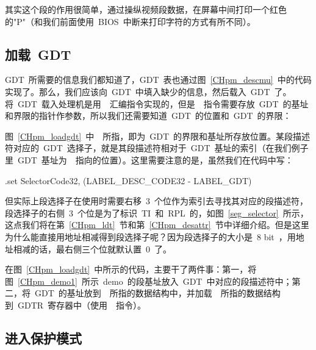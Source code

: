 \label{CHpm_demo1}

其实这个段的作用很简单，通过操纵视频段数据，在屏幕中间打印一个红色的"P"（和我们前面使用~BIOS~中断来打印字符的方式有所不同）。

\subsection{加载~GDT} \label{CHpm_secloadgdt}

GDT~所需要的信息我们都知道了，GDT~表也通过图~\ref{CHpm_descmu}~中的代码实现了。那么，我们应该向~GDT~中填入缺少的信息，然后载入~GDT~了。将~GDT~载入处理机是用~~汇编指令实现的，但是~~指令需要存放~GDT~的基址和界限的指针作参数，所以我们还需要知道~GDT~的位置和~GDT~的界限：

\label{CHpm_loadgdt}

图~\ref{CHpm_loadgdt}~中~~所指，即为~GDT~的界限和基址所存放位置。某段描述符对应的~GDT~选择子，就是其段描述符相对于~GDT~基址的索引（在我们例子里~GDT~基址为~~指向的位置）。这里需要注意的是，虽然我们在代码中写：

\begin{Command}
.set SelectorCode32, (LABEL_DESC_CODE32 - LABEL_GDT)
\end{Command}
但实际上段选择子在使用时需要右移~3~个位作为索引去寻找其对应的段描述符，段选择子的右侧~3~个位是为了标识~TI~和~RPL~的，如图~\ref{seg_selector}~所示，这点我们将在第~\ref{CHpm_ldt}~节和第~\ref{CHpm_desattr}~节中详细介绍。但是这里为什么能直接用地址相减得到段选择子呢？因为段选择子的大小是~8 bit~，用地址相减的话，最右侧三个位就默认置~0~了。

在图~\ref{CHpm_loadgdt}~中所示的代码，主要干了两件事：第一，将图~\ref{CHpm_demo1}~所示~demo~的段基址放入~GDT~中对应的段描述符中；第二，将~GDT~的基址放到~~所指的数据结构中，并加载~~所指的数据结构到~GDTR~寄存器中（使用~~指令）。

\subsection{进入保护模式}


